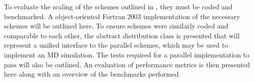To evaluate the scaling of the schemes outlined in
,
they must be coded and benchmarked.
%
A object-oriented Fortran 2003 implementation of
the necessary schemes will be outlined here.
%
To ensure schemes were similarly coded and comparable to each other,
the abstract distribution class is presented that will represent
a unified interface to the parallel schemes, which may be used to
implement an MD simulation.
%
The tests required for a parallel implementation to pass will also
be outlined.
%
An evaluation of performance metrics is then presented here along
with an overview of the benchmarks performed.
